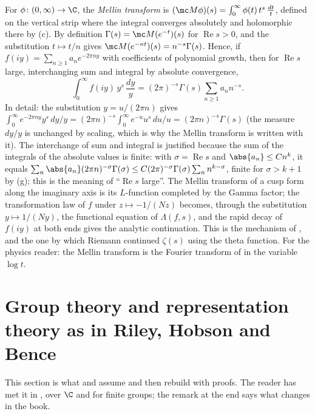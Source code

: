 \begin{remark}\label{rem:prereq:mellin}
For $\phi\colon(0,\infty)\to\C$, the \emph{Mellin transform} is
$(\mc M\phi)(s)=\int_0^\infty\phi(t)\,t^{s}\,\frac{dt}{t}$, defined on the vertical strip where the
integral converges absolutely and holomorphic there by (c). By
definition $\Gamma(s)=\mc M(e^{-t})(s)$ for $\operatorname{Re}s>0$, and the substitution
$t\mapsto t/n$ gives $\mc M(e^{-nt})(s)=n^{-s}\Gamma(s)$. Hence, if
$f(iy)=\sum_{n\ge1}a_ne^{-2\pi ny}$ with coefficients of polynomial growth, then for
$\operatorname{Re}s$ large, interchanging sum and integral by absolute convergence,
\[
\int_0^\infty f(iy)\,y^{s}\,\frac{dy}{y}=(2\pi)^{-s}\Gamma(s)\sum_{n\ge1}a_nn^{-s}.
\]
In detail: the substitution $y=u/(2\pi n)$ gives
$\int_0^\infty e^{-2\pi ny}y^{s}\,dy/y=(2\pi n)^{-s}\int_0^\infty e^{-u}u^{s}\,du/u=(2\pi n)^{-s}\Gamma(s)$
(the measure $dy/y$ is unchanged by scaling, which is why the Mellin transform is written with it).
The interchange of sum and integral is justified because the sum of the integrals of the absolute
values is finite: with $\sigma=\operatorname{Re}s$ and $\abs{a_n}\le Cn^k$, it equals
$\sum_n\abs{a_n}(2\pi n)^{-\sigma}\Gamma(\sigma)\le C(2\pi)^{-\sigma}\Gamma(\sigma)\sum_nn^{k-\sigma}$,
finite for $\sigma>k+1$ by (g); this is the meaning of ``$\operatorname{Re}s$
large''.
The Mellin transform of a cusp form along the imaginary axis is its $L$-function completed by the
Gamma factor; the transformation law of $f$ under $z\mapsto-1/(Nz)$ becomes, through the
substitution $y\mapsto1/(Ny)$, the functional equation of $\Lambda(f,s)$, and the rapid decay of
$f(iy)$ at both ends gives the analytic continuation. This is the mechanism of ,
and the one by which Riemann continued $\zeta(s)$ using the theta function. For the physics reader:
the Mellin transform is the Fourier transform of \cite[Chapter 13]{RHB06} in the variable $\log t$.
\end{remark}

\section[Group theory and representation theory]{Group theory and representation theory as in Riley, Hobson and Bence}\label{sec:prereq:groups}

This section is what  and  assume and then rebuild with proofs.
The reader has met it in \cite[Chapters 28 and 29]{RHB06}, over $\C$ and for finite groups; the
remark at the end says what changes in the book.

